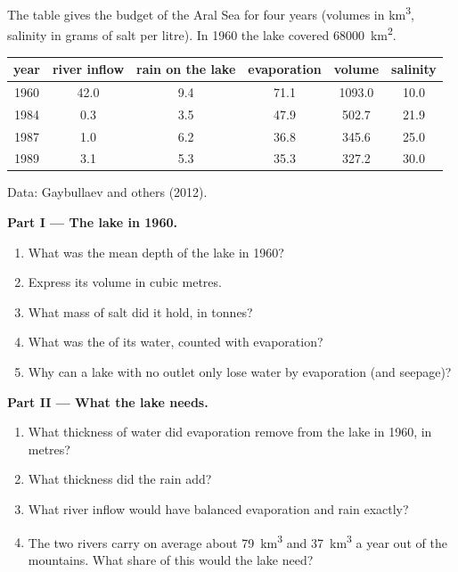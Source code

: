 \begin{problem}
\label{pb:g10:freshwater-resources:1}
The table gives the budget of the Aral Sea for four years (volumes in
\unit{km^3}, salinity in grams of salt per litre). In 1960 the lake covered
\qty{68000}{km^2}.
\begin{center}
\small
\begin{tabular}{|c|c|c|c|c|c|}
\hline
year & river inflow & rain on the lake & evaporation & volume & salinity \\ \hline
1960 & 42.0 & 9.4 & 71.1 & 1093.0 & 10.0 \\ \hline
1984 & 0.3 & 3.5 & 47.9 & 502.7 & 21.9 \\ \hline
1987 & 1.0 & 6.2 & 36.8 & 345.6 & 25.0 \\ \hline
1989 & 3.1 & 5.3 & 35.3 & 327.2 & 30.0 \\ \hline
\end{tabular}

{\small Data: Gaybullaev and others (2012).}
\end{center}

\medskip
\noindent\textbf{Part I --- The lake in 1960.}
\begin{enumerate}
  \item What was the mean depth of the lake in 1960?
  \item Express its volume in cubic metres.
  \item What mass of salt did it hold, in tonnes?
  \item What was the  of its water, counted with evaporation?
  \item Why can a lake with no outlet only lose water by evaporation (and
        seepage)?
\end{enumerate}

\medskip
\noindent\textbf{Part II --- What the lake needs.}
\begin{enumerate}[resume]
  \item What thickness of water did evaporation remove from the lake in
        1960, in metres?
  \item What thickness did the rain add?
  \item What river inflow would have balanced evaporation and rain exactly?
  \item The two rivers carry on average about \qty{79}{km^3} and
        \qty{37}{km^3} a year out of the mountains. What share of this would
        the lake need?
\end{enumerate}


\end{problem}
